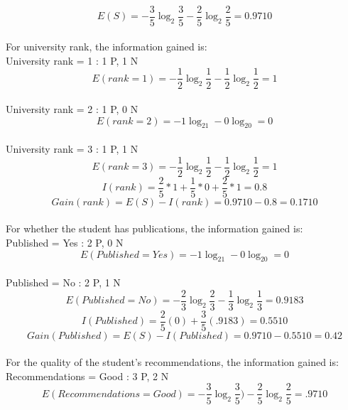 \documentclass[12pt]{article}
\begin{document}
\\
\begin{equation}
E(S) = -\frac{3}{5}\log_2\frac{3}{5} -\frac{2}{5}\log_2\frac{2}{5} = 0.9710
\end{equation}
\\
For university rank, the information gained is:
\\
University rank = 1 : 1 P, 1 N
\begin{equation}
E(rank = 1) = -\frac{1}{2}\log_2\frac{1}{2} -\frac{1}{2}\log_2\frac{1}{2} = 1
\end{equation}
\\
University rank = 2 : 1 P, 0 N
\begin{equation}
E(rank = 2) = -1\log_21 -0\log_20 = 0
\end{equation}
\\
University rank = 3 : 1 P, 1 N
\begin{equation}
E(rank = 3) = -\frac{1}{2}\log_2\frac{1}{2} -\frac{1}{2}\log_2\frac{1}{2} = 1
\end{equation}
\begin{equation}
I(rank) = \frac{2}{5} * 1 + \frac{1}{5} * 0 + \frac{2}{5} * 1 = 0.8
\end{equation}
\begin{equation}
Gain(rank) = E(S) - I(rank) = 0.9710 - 0.8 = 0.1710
\end{equation}
\\
For whether the student has publications, the information gained is:
\\
Published = Yes : 2 P, 0 N
\begin{equation}
E(Published = Yes) = -1\log_21 - 0\log_20 = 0
\end{equation}
\\
Published = No : 2 P, 1 N
\begin{equation}
E(Published = No) = -\frac{2}{3}\log_2\frac{2}{3} - \frac{1}{3}\log_2\frac{1}{3} = 0.9183
\end{equation}
\begin{equation}
I(Published) = \frac{2}{5}(0)+\frac{3}{5}(.9183) = 0.5510
\end{equation}
\begin{equation}
Gain(Published) = E(S) - I(Published) = 0.9710 - 0.5510 = 0.42
\end{equation}
\\
For the quality of the student's recommendations, the information gained is:
\\
Recommendations = Good : 3 P, 2 N
\begin{equation}
E(Recommendations = Good) = -\frac{3}{5}\log_2\frac{3}{5}) - \frac{2}{5}\log_2\frac{2}{5} = .9710
\end{equation}
\end{document}
